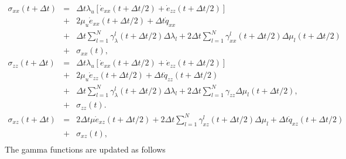 \documentclass[11pt]{article}
\begin{document}
\begin{eqnarray}
  \sigma_{xx}(t+\Delta t) & = & \Delta t\lambda_u 
                               \left [
                                 \dot{e}_{xx}(t+\Delta t/2)  + 
                                 \dot{e}_{zz}(t+\Delta t/2)
                               \right]\nonumber                              \\
                          & + & 2\mu_u \dot{e}_{xx}(t+\Delta t/2) 
                                +\Delta t\dot{q}_{xx}               \nonumber\\
                          & + & \Delta t\sum_{l=1}^N
                                 \gamma^l_{\lambda}(t+\Delta t/2)
                                 \Delta\lambda_l  
                               +2\Delta t\sum_{l=1}^N
                                 \gamma^l_{xx}(t+\Delta t/2)
                                 \Delta\mu_l(t+\Delta t/2)          \nonumber\\ 
                          & + &\sigma_{xx}(t),                               \\
  \sigma_{zz}(t+\Delta t) & = & \Delta t\lambda_u 
                            \left [\dot{e}_{xx}(t+\Delta t/2) 
                            + \dot{e}_{zz}(t+\Delta t/2)\right]           \\
                          & + & 2\mu_u \dot{e}_{zz}(t+\Delta t/2) 
                             +\Delta t \dot{q}_{zz}(t+\Delta t/2) \nonumber  \\
                          & + & \Delta t\sum_{l=1}^N
                                \gamma^l_{\lambda}(t+\Delta t/2)\Delta\lambda_l 
                            +   2\Delta t\sum_{l=1}^N
                                \gamma_{zz}
                                \Delta\mu_l (t+\Delta t/2)\nonumber,         \\
                          & + & \sigma_{zz}(t).\\
  \sigma_{xz}(t+\Delta t) & = & 2\Delta t\mu \dot{e}_{xz}(t+\Delta t/2) 
                               + 2\Delta t \sum_{l=1}^N
                               \gamma^l_{xz}(t+\Delta t/2)\Delta\mu_l+
                               \Delta t \dot{q}_{xz}(t+\Delta t/2)\nonumber\\ 
                          & +& \sigma_{xz}(t),\\
                          \label{eq:stress2d}
\end{eqnarray} 
The gamma functions are updated as follows
\end{document}
